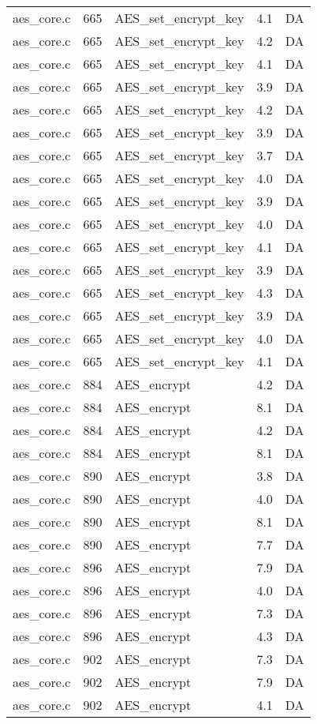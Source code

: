 \begin{table}[h!]
\begin{tabular}{lrlrr}
aes\_core.c& 665&AES\_set\_encrypt\_key&4.1 &DA\\
aes\_core.c& 665&AES\_set\_encrypt\_key&4.2 &DA\\
aes\_core.c& 665&AES\_set\_encrypt\_key&4.1 &DA\\
aes\_core.c& 665&AES\_set\_encrypt\_key&3.9 &DA\\
aes\_core.c& 665&AES\_set\_encrypt\_key&4.2 &DA\\
aes\_core.c& 665&AES\_set\_encrypt\_key&3.9 &DA\\
aes\_core.c& 665&AES\_set\_encrypt\_key&3.7 &DA\\
aes\_core.c& 665&AES\_set\_encrypt\_key&4.0 &DA\\
aes\_core.c& 665&AES\_set\_encrypt\_key&3.9 &DA\\
aes\_core.c& 665&AES\_set\_encrypt\_key&4.0 &DA\\
aes\_core.c& 665&AES\_set\_encrypt\_key&4.1 &DA\\
aes\_core.c& 665&AES\_set\_encrypt\_key&3.9 &DA\\
aes\_core.c& 665&AES\_set\_encrypt\_key&4.3 &DA\\
aes\_core.c& 665&AES\_set\_encrypt\_key&3.9 &DA\\
aes\_core.c& 665&AES\_set\_encrypt\_key&4.0 &DA\\
aes\_core.c& 665&AES\_set\_encrypt\_key&4.1 &DA\\
aes\_core.c& 884&AES\_encrypt&4.2 &DA\\
aes\_core.c& 884&AES\_encrypt&8.1 &DA\\
aes\_core.c& 884&AES\_encrypt&4.2 &DA\\
aes\_core.c& 884&AES\_encrypt&8.1 &DA\\
aes\_core.c& 890&AES\_encrypt&3.8 &DA\\
aes\_core.c& 890&AES\_encrypt&4.0 &DA\\
aes\_core.c& 890&AES\_encrypt&8.1 &DA\\
aes\_core.c& 890&AES\_encrypt&7.7 &DA\\
aes\_core.c& 896&AES\_encrypt&7.9 &DA\\
aes\_core.c& 896&AES\_encrypt&4.0 &DA\\
aes\_core.c& 896&AES\_encrypt&7.3 &DA\\
aes\_core.c& 896&AES\_encrypt&4.3 &DA\\
aes\_core.c& 902&AES\_encrypt&7.3 &DA\\
aes\_core.c& 902&AES\_encrypt&7.9 &DA\\
aes\_core.c& 902&AES\_encrypt&4.1 &DA\\

\end{tabular}
\end{table}
